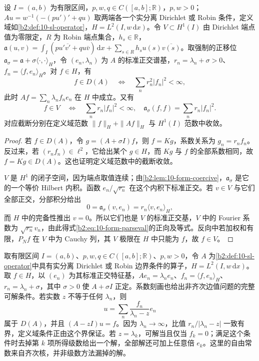\begin{proposition}[定义域和能量的系数刻画]\label{b2:prop:10-spectral-domains}
设 \(I=(a,b)\) 为有限区间，\(p,w,q\in C([a,b];\mathbb R)\)，\(p,w>0\)；\(Au=w^{-1}(-(pu')'+qu)\) 取两端各一个实分离 Dirichlet 或 Robin 条件，定义域如\cref{b2:def:10-sl-operator}，\(H=L^2(I,w\,\mathrm dx)\)。令 \(V\subset H^1(I)\) 由 Dirichlet 端点值为零限定，\(R\) 为 Robin 端点集合，\(h_s\in\mathbb R\)，\(\mathfrak a(u,v)=\int_I(pu'\overline{v'}+qu\overline v)\,\mathrm dx+\sum_{s\in R}h_su(s)\overline{v(s)}\)。取强制的正移位 \(\mathfrak a_\sigma=\mathfrak a+\sigma\langle\cdot,\cdot\rangle_H\)，令 \((e_n,\lambda_n)\) 为 \(A\) 的标准正交谱基，\(r_n=\lambda_n+\sigma>0\)、\(f_n=\langle f,e_n\rangle_H\)。对 \(f\in H\)，有
\[
 f\in D(A)\quad\Longleftrightarrow\quad
 \sum_n r_n^2|f_n|^2<\infty,
\]
此时 \(Af=\sum_n\lambda_nf_ne_n\) 在 \(H\) 中成立。又有
\begin{equation}\label{b2:eq:10-form-parseval}
 f\in V\quad\Longleftrightarrow\quad\sum_n r_n|f_n|^2<\infty,
 \quad\mathfrak a_\sigma(f,f)=\sum_n r_n|f_n|^2.
\end{equation}
对应截断分别在定义域范数 \(\|f\|_H+\|Af\|_H\) 与 \(H^1(I)\) 范数中收敛。
\end{proposition}
\begin{proof}
若 \(f\in D(A)\)，令 \(g=(A+\sigma I)f\)，则 \(f=Kg\)，系数关系为 \(g_n=r_nf_n\)。反过来，若 \((r_nf_n)\in\ell^2\)，它给出某个 \(g\in H\)，而 \(Kg\) 与 \(f\) 的全部系数相同，故 \(f=Kg\in D(A)\)。这也证明定义域范数中的截断收敛。

\(V\) 是 \(H^1\) 的闭子空间，因为端点取值连续；由\cref{b2:lem:10-form-coercive}，\(\mathfrak a_\sigma\) 是它的一个等价 Hilbert 内积。函数 \(e_n/\sqrt{r_n}\) 在这个内积下标准正交。若 \(v\in V\) 与它们全部正交，分部积分给出
\[
 0=\mathfrak a_\sigma(v,e_n)=r_n\langle v,e_n\rangle_H,
\]
而 \(H\) 中的完备性推出 \(v=0\)。所以它们也是 \(V\) 的标准正交基，\(V\) 中的 Fourier 系数为 \(\sqrt{r_n}v_n\)，由此得式\eqref{b2:eq:10-form-parseval}的正向及等式。反向中若加权和有限，\(P_Nf\) 在 \(V\) 中为 Cauchy 列，其 \(V\) 极限在 \(H\) 中只能为 \(f\)，故 \(f\in V\)。
\end{proof}

取有限区间 \(I=(a,b)\)、\(p,w,q\in C([a,b];\mathbb R)\)、\(p,w>0\)，令 \(A\) 为\cref{b2:def:10-sl-operator}中具有实分离 Dirichlet 或 Robin 边界条件的算子，\(H=L^2(I,w\,\mathrm dx)\)。取 \(f\in H\)，以 \((e_n)\) 为其标准正交特征基，\(Ae_n=\lambda_ne_n\)、\(f_n=\langle f,e_n\rangle_H\)、\(r_n=\lambda_n+\sigma\)，其中 \(\sigma>0\) 使 \(A+\sigma I\) 正定。系数刻画也给出非齐次边值问题的完整可解条件。若实数 \(z\) 不等于任何 \(\lambda_n\)，则
\[
 u=\sum_n\dfrac{f_n}{\lambda_n-z}e_n
\]
属于 \(D(A)\)，并且 \((A-zI)u=f\)。因为 \(\lambda_n\to\infty\)，比值 \(r_n/|\lambda_n-z|\) 一致有界，定义域条件正由这个界保证。若 \(z=\lambda_k\)，可解当且仅当 \(f_k=0\)；满足这个条件时去掉第 \(k\) 项所得级数给出一个解，全部解还可加上任意倍 \(e_k\)。这里的自由常数来自齐次核，并非级数方法漏掉的解。

